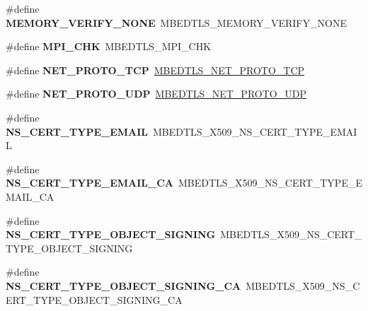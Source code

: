 \begin{DoxyCompactItemize}
\#define {\bfseries M\+E\+M\+O\+R\+Y\+\_\+\+V\+E\+R\+I\+F\+Y\+\_\+\+N\+O\+NE}~M\+B\+E\+D\+T\+L\+S\+\_\+\+M\+E\+M\+O\+R\+Y\+\_\+\+V\+E\+R\+I\+F\+Y\+\_\+\+N\+O\+NE
\item 
\mbox{\label{compat-1_83_8h_af547433830b08cd9bded61f6b3cba077}} 
\#define {\bfseries M\+P\+I\+\_\+\+C\+HK}~M\+B\+E\+D\+T\+L\+S\+\_\+\+M\+P\+I\+\_\+\+C\+HK
\item 
\mbox{\label{compat-1_83_8h_a32ba3ba53f92561f4c6ce17476b6aa47}} 
\#define {\bfseries N\+E\+T\+\_\+\+P\+R\+O\+T\+O\+\_\+\+T\+CP}~\mbox{\hyperlink{net__sockets_8h_a989e1bc1aae7e48ac318d5ddd24efa3b}{M\+B\+E\+D\+T\+L\+S\+\_\+\+N\+E\+T\+\_\+\+P\+R\+O\+T\+O\+\_\+\+T\+CP}}
\item 
\mbox{\label{compat-1_83_8h_a10aa117699627c9d4fe7f03cfc571a73}} 
\#define {\bfseries N\+E\+T\+\_\+\+P\+R\+O\+T\+O\+\_\+\+U\+DP}~\mbox{\hyperlink{net__sockets_8h_a8d6d212e9f0ea5756fff8d06c46f4f44}{M\+B\+E\+D\+T\+L\+S\+\_\+\+N\+E\+T\+\_\+\+P\+R\+O\+T\+O\+\_\+\+U\+DP}}
\item 
\mbox{\label{compat-1_83_8h_aa06876013b3e2b9098529e18e17e96e9}} 
\#define {\bfseries N\+S\+\_\+\+C\+E\+R\+T\+\_\+\+T\+Y\+P\+E\+\_\+\+E\+M\+A\+IL}~M\+B\+E\+D\+T\+L\+S\+\_\+\+X509\+\_\+\+N\+S\+\_\+\+C\+E\+R\+T\+\_\+\+T\+Y\+P\+E\+\_\+\+E\+M\+A\+IL
\item 
\mbox{\label{compat-1_83_8h_a62f25762eb59728f92b07d61ae2057a5}} 
\#define {\bfseries N\+S\+\_\+\+C\+E\+R\+T\+\_\+\+T\+Y\+P\+E\+\_\+\+E\+M\+A\+I\+L\+\_\+\+CA}~M\+B\+E\+D\+T\+L\+S\+\_\+\+X509\+\_\+\+N\+S\+\_\+\+C\+E\+R\+T\+\_\+\+T\+Y\+P\+E\+\_\+\+E\+M\+A\+I\+L\+\_\+\+CA
\item 
\mbox{\label{compat-1_83_8h_ab74494b8a65972aebb605bdd9680d545}} 
\#define {\bfseries N\+S\+\_\+\+C\+E\+R\+T\+\_\+\+T\+Y\+P\+E\+\_\+\+O\+B\+J\+E\+C\+T\+\_\+\+S\+I\+G\+N\+I\+NG}~M\+B\+E\+D\+T\+L\+S\+\_\+\+X509\+\_\+\+N\+S\+\_\+\+C\+E\+R\+T\+\_\+\+T\+Y\+P\+E\+\_\+\+O\+B\+J\+E\+C\+T\+\_\+\+S\+I\+G\+N\+I\+NG
\item 
\mbox{\label{compat-1_83_8h_a57c9011afb5ab5f02020e1e31b43b871}} 
\#define {\bfseries N\+S\+\_\+\+C\+E\+R\+T\+\_\+\+T\+Y\+P\+E\+\_\+\+O\+B\+J\+E\+C\+T\+\_\+\+S\+I\+G\+N\+I\+N\+G\+\_\+\+CA}~M\+B\+E\+D\+T\+L\+S\+\_\+\+X509\+\_\+\+N\+S\+\_\+\+C\+E\+R\+T\+\_\+\+T\+Y\+P\+E\+\_\+\+O\+B\+J\+E\+C\+T\+\_\+\+S\+I\+G\+N\+I\+N\+G\+\_\+\+CA

\end{DoxyCompactItemize}
